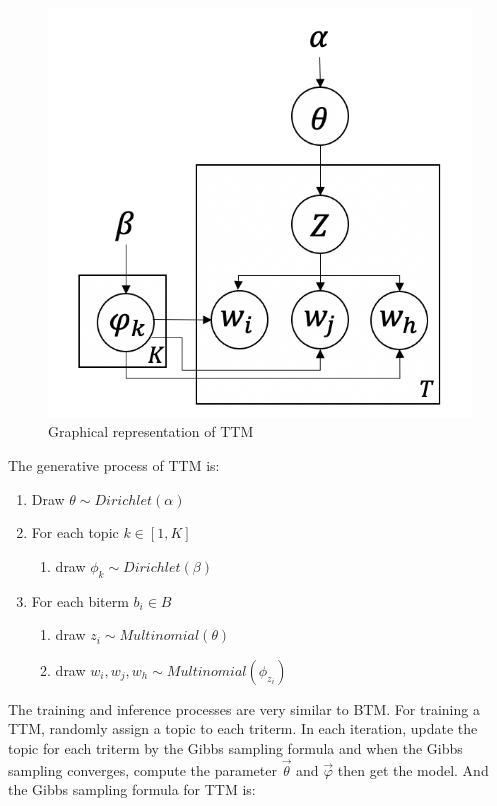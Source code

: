 \begin{figure}[H]
    \centering
    \includegraphics[scale=0.6]{images/TTM_graph.png}
    \caption{Graphical representation of TTM}
    \label{fig:8}
\end{figure}

The generative process of TTM is:
\begin{enumerate}
    \item Draw $\theta\sim Dirichlet(\alpha)$
    \item For each topic $k\in[1,K]$
    \begin{enumerate}
        \item draw $\phi_k\sim Dirichlet(\beta)$
    \end{enumerate}
    \item For each biterm $b_i\in B$
    \begin{enumerate}
        \item draw $z_i\sim Multinomial(\theta)$
        \item draw $w_i,w_j,w_h\sim Multinomial(\phi_{z_i})$
    \end{enumerate}
\end{enumerate}

The training and inference processes are very similar to BTM. For training a TTM, randomly assign a topic to each triterm. In each iteration, update the topic for each triterm by the Gibbs sampling formula and when the Gibbs sampling converges, compute the parameter $\vec\theta$ and $\vec\varphi$ then get the model. And the Gibbs sampling formula for TTM is:

